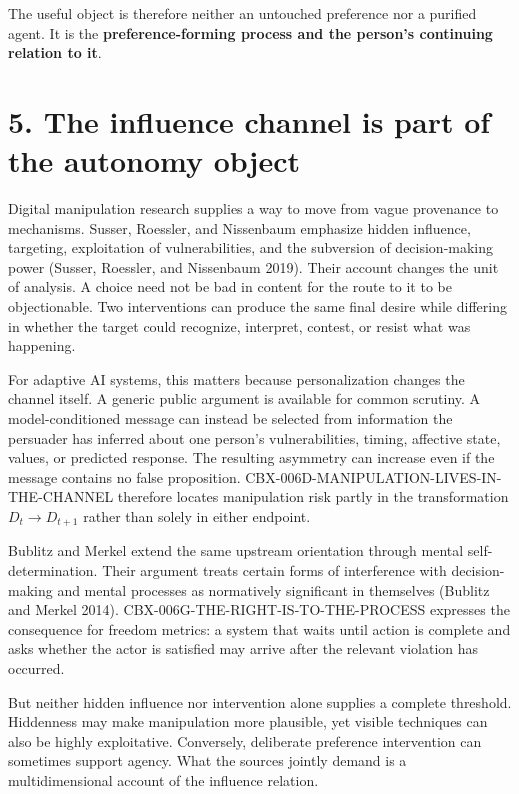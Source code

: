 \documentclass[
  10pt,
]{article}
\begin{document}
The useful object is therefore neither an untouched preference nor a
purified agent. It is the \textbf{preference-forming process and the
person's continuing relation to it}.

\section{5. The influence channel is part of the autonomy
object}\label{the-influence-channel-is-part-of-the-autonomy-object}

Digital manipulation research supplies a way to move from vague
provenance to mechanisms. Susser, Roessler, and Nissenbaum emphasize
hidden influence, targeting, exploitation of vulnerabilities, and the
subversion of decision-making power (Susser, Roessler, and Nissenbaum
2019). Their account changes the unit of analysis. A choice need not be
bad in content for the route to it to be objectionable. Two
interventions can produce the same final desire while differing in
whether the target could recognize, interpret, contest, or resist what
was happening.

For adaptive AI systems, this matters because personalization changes
the channel itself. A generic public argument is available for common
scrutiny. A model-conditioned message can instead be selected from
information the persuader has inferred about one person's
vulnerabilities, timing, affective state, values, or predicted response.
The resulting asymmetry can increase even if the message contains no
false proposition. CBX-006D-MANIPULATION-LIVES-IN-THE-CHANNEL therefore
locates manipulation risk partly in the transformation
\(D_t \rightarrow D_{t+1}\) rather than solely in either endpoint.

Bublitz and Merkel extend the same upstream orientation through mental
self-determination. Their argument treats certain forms of interference
with decision-making and mental processes as normatively significant in
themselves (Bublitz and Merkel 2014).
CBX-006G-THE-RIGHT-IS-TO-THE-PROCESS expresses the consequence for
freedom metrics: a system that waits until action is complete and asks
whether the actor is satisfied may arrive after the relevant violation
has occurred.

But neither hidden influence nor intervention alone supplies a complete
threshold. Hiddenness may make manipulation more plausible, yet visible
techniques can also be highly exploitative. Conversely, deliberate
preference intervention can sometimes support agency. What the sources
jointly demand is a multidimensional account of the influence relation.
\end{document}
